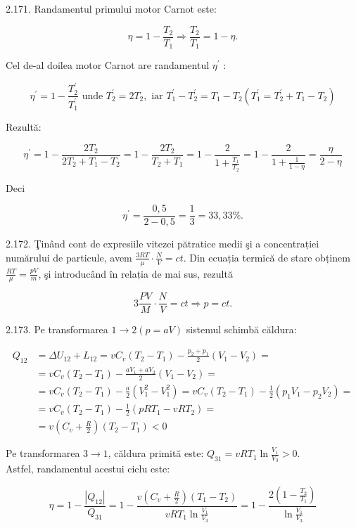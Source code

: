 2.171. Randamentul primului motor Carnot este:

$$
\eta=1-\frac{T_{2}}{T_{1}} \Rightarrow \frac{T_{2}}{T_{1}}=1-\eta .
$$

Cel de-al doilea motor Carnot are randamentul $\eta^{\prime}$ :

$$
\eta^{\prime}=1-\frac{T_{2}^{\prime}}{T_{1}^{\prime}} \text { unde } T_{2}^{\prime}=2 T_{2}, \text { iar } T_{1}^{\prime}-T_{2}^{\prime}=T_{1}-T_{2}\left(T_{1}^{\prime}=T_{2}^{\prime}+T_{1}-T_{2}\right)
$$

Rezultă:

$$
\eta^{\prime}=1-\frac{2 T_{2}}{2 T_{2}+T_{1}-T_{2}}=1-\frac{2 T_{2}}{T_{2}+T_{1}}=1-\frac{2}{1+\frac{T_{1}}{T_{2}}}=1-\frac{2}{1+\frac{1}{1-\eta}}=\frac{\eta}{2-\eta}
$$

Deci

$$
\eta^{\prime}=\frac{0,5}{2-0,5}=\frac{1}{3}=33,33 \% .
$$

2.172. Ţinând cont de expresiile vitezei pătratice medii şi a concentrației numărului de particule, avem $\frac{3 R T}{\mu} \cdot \frac{N}{V}=c t$. Din ecuația termică de stare obținem $\frac{R T}{\mu}=\frac{p V}{m}$, şi introducând în relația de mai sus, rezultă

$$
3 \frac{P V}{M} \cdot \frac{N}{V}=c t \Rightarrow p=c t .
$$

2.173. Pe transformarea $1 \rightarrow 2(p=a V)$ sistemul schimbă căldura:

$$
\begin{aligned}
Q_{12} & =\Delta U_{12}+L_{12}=v C_{v}\left(T_{2}-T_{1}\right)-\frac{p_{2}+p_{1}}{2}\left(V_{1}-V_{2}\right)= \\
& =v C_{v}\left(T_{2}-T_{1}\right)-\frac{a V_{1}+a V_{2}}{2}\left(V_{1}-V_{2}\right)= \\
& =v C_{v}\left(T_{2}-T_{1}\right)-\frac{a}{2}\left(V_{1}^{2}-V_{1}^{2}\right)=v C_{v}\left(T_{2}-T_{1}\right)-\frac{1}{2}\left(p_{1} V_{1}-p_{2} V_{2}\right)= \\
& =v C_{v}\left(T_{2}-T_{1}\right)-\frac{1}{2}\left(p R T_{1}-v R T_{2}\right)= \\
& =v\left(C_{v}+\frac{R}{2}\right)\left(T_{2}-T_{1}\right)<0
\end{aligned}
$$

Pe transformarea $3 \rightarrow 1$, căldura primită este: $Q_{31}=v R T_{1} \ln \frac{V_{1}}{V_{3}}>0$.\\
Astfel, randamentul acestui ciclu este:

$$
\eta=1-\frac{\left|Q_{12}\right|}{Q_{31}}=1-\frac{v\left(C_{v}+\frac{R}{2}\right)\left(T_{1}-T_{2}\right)}{v R T_{1} \ln \frac{V_{1}}{V_{3}}}=1-\frac{2\left(1-\frac{T_{2}}{T_{1}}\right)}{\ln \frac{V_{1}}{V_{3}}}
$$

